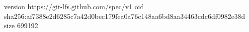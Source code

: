 version https://git-lfs.github.com/spec/v1
oid sha256:af7388e2d6285c7a42d0bec179fea0a76c148aa6bd8aa34463cdc6df0982e38d
size 699192
